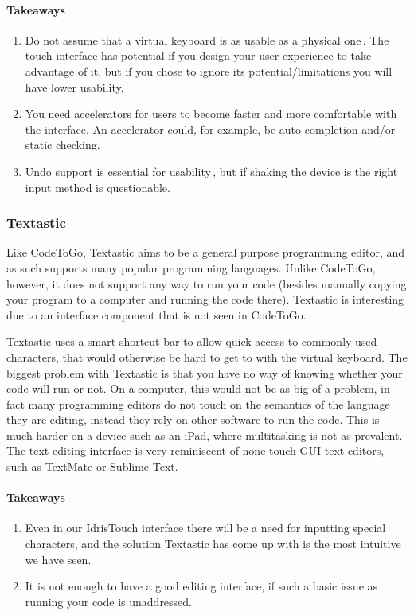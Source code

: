 \paragraph{Takeaways}
\begin{enumerate}
	\item Do not assume that a virtual keyboard is as usable as a physical one\,\cite{nielsen2013mobile}. The touch interface has potential if you design your user experience to take advantage of it, but if you chose to ignore its potential/limitations you will have lower usability.
	\item You need accelerators for users to become faster and more comfortable with the interface. An accelerator could, for example, be auto completion and/or static checking.
	\item Undo support is essential for usability\,\cite{nielsen1990heuristic}, but if shaking the device is the right input method is questionable.
\end{enumerate}

\subsubsection{Textastic}

Like CodeToGo, Textastic aims to be a general purpose programming editor, and as such supports many popular programming languages. Unlike CodeToGo, however, it does not support any way to run your code (besides manually copying your program to a computer and running the code there). Textastic is interesting due to an interface component that is not seen in CodeToGo.

Textastic uses a smart shortcut bar to allow quick access to commonly used characters, that would otherwise be hard to get to with the virtual keyboard. The biggest problem with Textastic is that you have no way of knowing whether your code will run or not. On a computer, this would not be as big of a problem, in fact many programming editors do not touch on the semantics of the language they are editing, instead they rely on other software to run the code. This is much harder on a device such as an iPad, where multitasking is not as prevalent. The text editing interface is very reminiscent of none-touch GUI text editors, such as TextMate or Sublime Text. 

\paragraph{Takeaways}
\begin{enumerate}
	\item Even in our IdrisTouch interface there will be a need for inputting special characters, and the solution Textastic has come up with is the most intuitive we have seen.
	\item It is not enough to have a good editing interface, if such a basic issue as running your code is unaddressed.
\end{enumerate}



